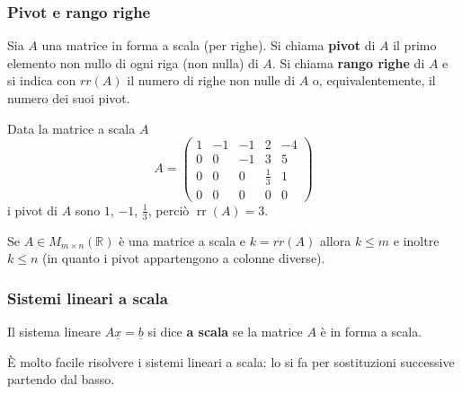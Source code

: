 \documentclass[
  a4paper,
]{article}
\begin{document}
\hypertarget{pivot-e-rango-righe}{%
\subsubsection{Pivot e rango righe}\label{pivot-e-rango-righe}}

\begin{definitionbox}
Sia \(A\) una matrice in forma a scala (per righe). Si chiama
\textbf{pivot} di \(A\) il primo elemento non nullo di ogni riga (non
nulla) di \(A\). Si chiama \textbf{rango righe} di \(A\) e si indica con
\(rr(A)\) il numero di righe non nulle di \(A\) o, equivalentemente, il
numero dei suoi pivot.
\end{definitionbox}

\begin{examplebox}
Data la matrice a scala \(A\) \[
A=
\begin{pmatrix}
1 & -1 & -1 & 2 & -4\\
0 & 0 & -1 & 3 & 5\\
0 & 0 & 0 & \frac{1}{3} & 1\\
0 & 0 & 0 & 0 & 0
\end{pmatrix}
\] i pivot di \(A\) sono \(1\), \(-1\), \(\frac{1}{3}\), perciò
\(\operatorname{rr}(A)=3\).
\end{examplebox}

\begin{observationbox}
Se \(A \in M_{m \times n}(\mathbb{R})\) è una matrice a scala e
\(k = rr(A)\) allora \(k \leq m\) e inoltre \(k \leq n\) (in quanto i
pivot appartengono a colonne diverse).
\end{observationbox}

\hypertarget{sistemi-lineari-a-scala}{%
\subsubsection{Sistemi lineari a scala}\label{sistemi-lineari-a-scala}}

\begin{definitionbox}
Il sistema lineare \(A\underline{x} = \underline{b}\) si dice \textbf{a
scala} se la matrice \(A\) è in forma a scala.
\end{definitionbox}

È molto facile risolvere i sistemi lineari a scala: lo si fa per
sostituzioni successive partendo dal basso.
\end{document}
